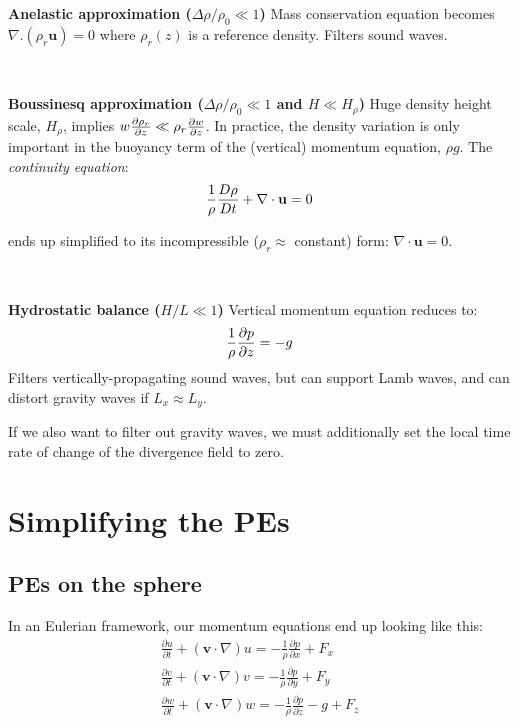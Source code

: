 {\bf Anelastic approximation ($\Delta \rho /\rho_0 \ll 1$)} Mass conservation equation becomes $\nabla.(\rho_r {\mathbf u})=0$
where $\rho_r(z)$ is a reference density.
Filters sound waves.

~

{\bf Boussinesq approximation ($\Delta \rho /\rho_0 \ll 1$ and $H\ll H_{\rho}$)} Huge density height scale, $H_{\rho}$, implies $w \frac{\partial \rho_r}{\partial z}\ll
\rho_r \frac{\partial w}{\partial z}$. In practice, the density variation is only important in the buoyancy term of the (vertical) momentum equation, $\rho g$. The \emph{continuity equation}:
\begin{equation}
	\frac{1}{\rho} \frac{D \rho}{D t} + \nabla \cdot \mathbf{u} = 0
	\label{continuity-equation}
\end{equation}

ends up simplified to its incompressible ($\rho_r \approx$ constant) form: $\nabla \cdot \mathbf{u} = 0$. 

~

{\bf Hydrostatic balance ($H/L \ll 1$)} Vertical momentum equation reduces to:
\begin{equation}
	\frac{1}{\rho}\frac{\partial p}{\partial z}=-g
	\label{hydrostatic}
\end{equation}
Filters vertically-propagating sound waves, but can support Lamb waves, and can distort gravity waves if $L_x \approx L_y$.

If we also want to filter out gravity waves, we must additionally set the local time rate of change of the divergence field to zero.


\section{Simplifying the PEs}
\subsection{PEs on the sphere}
In an Eulerian framework, our momentum equations end up looking like this:
\begin{eqnarray}
	\frac {\partial u}{\partial t} + \left(\mathbf{v}\cdot\nabla\right)u=-\frac{1}{\rho} \frac{\partial p}{\partial x}+F_x \\
	\frac {\partial v}{\partial t} + \left(\mathbf{v}\cdot\nabla\right)v=-\frac{1}{\rho} \frac{\partial p}{\partial y}+F_y \\
	\frac {\partial w}{\partial t} + \left(\mathbf{v}\cdot\nabla\right)w=-\frac{1}{\rho} \frac{\partial p}{\partial z}-g+F_z
\end{eqnarray}

